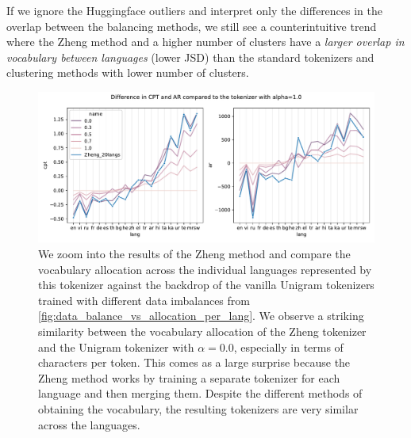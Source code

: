 If we ignore the Huggingface outliers and interpret only the differences in the overlap between the balancing methods, we still see a counterintuitive trend where the Zheng method and a higher number of clusters have a \textit{larger overlap in vocabulary between languages} (lower JSD) than the standard tokenizers and clustering methods with lower number of clusters.

\begin{figure}
    \centering
    \includegraphics[width=\textwidth]{figures/zheng_vs_alphas.pdf}
    \caption{We zoom into the results of the Zheng method and compare the vocabulary allocation across the individual languages represented by this tokenizer against the backdrop of the vanilla Unigram tokenizers trained with different data imbalances from \ref{fig:data_balance_vs_allocation_per_lang}. We observe a striking similarity between the vocabulary allocation of the Zheng tokenizer and the Unigram tokenizer with $\alpha=0.0$, especially in terms of characters per token. This comes as a large surprise because the Zheng method works by training a separate tokenizer for each language and then merging them. Despite the different methods of obtaining the vocabulary, the resulting tokenizers are very similar across the languages.}
    \label{fig:zheng_vs_alphas}
\end{figure}

